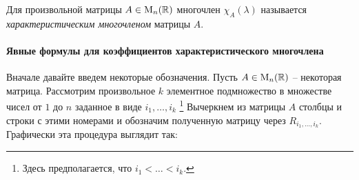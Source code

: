 \begin{definition}
Для произвольной матрицы $A\in\operatorname{M}_{n}(\mathbb R)$ многочлен $\chi_A(\lambda)$ называется {\it характеристическим многочленом} матрицы $A$.
\end{definition}

\paragraph{Явные формулы для коэффициентов характеристического многочлена}

Вначале давайте введем некоторые обозначения.
Пусть $A\in\operatorname{M}_{n}(\mathbb R)$ -- некоторая матрица.
Рассмотрим произвольное $k$ элементное подмножество в множестве чисел от $1$ до $n$ заданное в виде $i_1,\ldots, i_k$%
\footnote{Здесь предполагается, что $i_1 < \ldots < i_k$.}
Вычеркнем из матрицы $A$ столбцы и строки с этими номерами и обозначим полученную матрицу через $R_{i_1,\ldots,i_k}$.
Графически эта процедура выглядит так:
